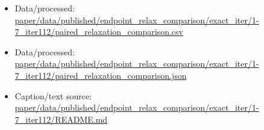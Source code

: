 \begin{itemize}[leftmargin=1.4em,noitemsep]
\item Data/processed: \begingroup\scriptsize\url{paper/data/published/endpoint_relax_comparison/exact_iter/1-7_iter112/paired_relaxation_comparison.csv}\endgroup
\item Data/processed: \begingroup\scriptsize\url{paper/data/published/endpoint_relax_comparison/exact_iter/1-7_iter112/paired_relaxation_comparison.json}\endgroup
\item Caption/text source: \begingroup\scriptsize\url{paper/data/published/endpoint_relax_comparison/exact_iter/1-7_iter112/README.md}\endgroup
\end{itemize}
